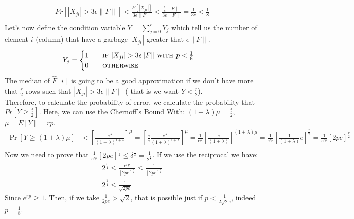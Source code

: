 \documentclass[a4paper]{article}
\begin{document}
\begin{align*}
 Pr[|X_{ji}|>   3\epsilon \|F\| ]< \frac{E[|X_{ji}|]}{3\epsilon \|F\|}< \frac{\frac{\epsilon}{e} \|F\|}{3\epsilon \|F\|}= \frac{1}{3e } < \frac{1}{8}\\
\end{align*}
Let's now define the condition variable $Y=\sum_{j=0}^r Y_j$ which tell us the number of element $i$ (column) that have a garbage $|X_{ji}|$ greater that $\epsilon \|F\|$. 
\begin{equation}
Y_{j} =  
\begin{cases} 
1 \qquad \textsc{if } |X_{ji}|>   3\epsilon \|F\|\textsc{ with } p<\frac{1}{8}\\
0 \qquad \textsc{otherwise}
\end{cases}
\nonumber
\end{equation}
The median of $\hat{F}[i]$ is going to be a good approximation if we don't have more that $\frac{r}{2}$ rows such that $|X_{ji}|>   3\epsilon \|F\|$ ( that is we want $Y < \frac{r}{2}$). \\
Therefore, to calculate the probability of error, we calculate the probability that $Pr[ Y \geq \frac{t}{2}]$. Here, we can use the Chernoff’s Bound
With: $(1+\lambda )\mu =\frac{t}{2}$, $\mu = E[Y]=rp$.
\begin{align*}
\Pr[Y\geq (1+\lambda )\mu] &< \left[{\frac {e^{\lambda }}{(1+\lambda )^{1+\lambda }}}\right]^{\mu}=\left[{\frac{e}{e} \frac {e^{\lambda }}{(1+\lambda )^{1+\lambda }}}\right]^{\mu}=\frac{1}{e^{\mu}}\left[{\frac {e}{(1+\lambda )}}\right]^{(1+\lambda)\mu}=\frac{1}{e^{rp}}\left[{\frac {1}{(1+\lambda )}e}\right]^{\frac{r}{2}}=\frac{1}{e^{rp}}\left[{2pe}\right]^{\frac{r}{2}}\\
\end{align*}
Now we need to prove that $\frac{1}{e^{rp}}\left[{2pe}\right]^{\frac{r}{2}} \leq \delta^{\frac{1}{4}}=\frac{1}{2^{\frac{r}{4}}}$. If we use the reciprocal we have:
\begin{align*}
2^{\frac{r}{4}} \leq \frac{e^{rp}}{\left[{2pe}\right]^{\frac{r}{2}} }\leq \frac{1}{\left[{2pe}\right]^{\frac{r}{2}} }\\
2^{\frac{1}{4}} \leq \frac{1}{ \sqrt{2pe} } 
\end{align*} 
Since $e^{rp}\geq 1$. Then, if we take $\frac{1}{ 2pe } > \sqrt{2} $, that is possible just if $p < \frac{1}{ 2 \sqrt{2}e }$, indeed $p=\frac{1}{8}$.
\end{document}
